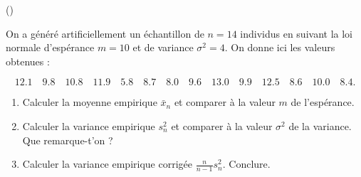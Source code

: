 \begin{exercice}\label{exo5-1} (\minsyndical)

On a g\'en\'er\'e artificiellement un \'echantillon de $n=14$ individus en suivant la loi normale
d'esp\'erance $m=10$ et de variance $\sigma^2=4$. On donne ici les valeurs obtenues :

\[
12.1\quad9.8\quad10.8\quad11.9\quad5.8\quad8.7\quad8.0\quad9.6\quad13.0\quad9.9\quad12.5\quad8.6\quad10.0\quad8.4. 
\]

\begin{enumerate}

\item Calculer la moyenne empirique $\bar{x}_n$ et comparer \`a la valeur $m$ de l'esp\'erance.

\item Calculer la variance empirique $s^2_n$ et comparer \`a la valeur $\sigma^2$ de la variance.\\
Que remarque-t'on ?

\item Calculer la variance empirique corrig\'ee $\frac{n}{n-1} s^2_n$. Conclure.\\

\end{enumerate}


\end{exercice}
